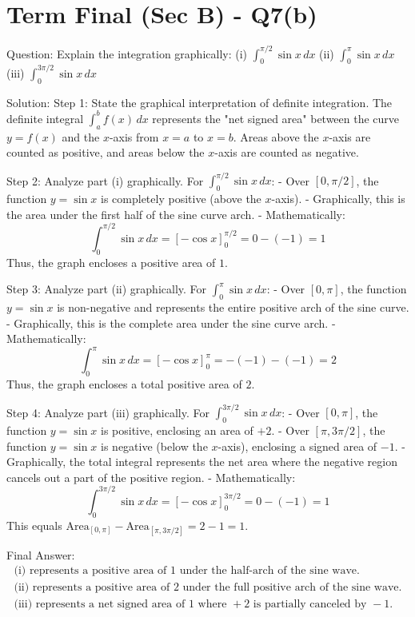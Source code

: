 \documentclass{article}
\begin{document}
\section*{Term Final (Sec B) - Q7(b)}
Question:
Explain the integration graphically:
(i) $\int_0^{\pi/2} \sin x \, dx$ 
(ii) $\int_0^{\pi} \sin x \, dx$ 
(iii) $\int_0^{3\pi/2} \sin x \, dx$

Solution:
Step 1: State the graphical interpretation of definite integration.
The definite integral $\int_a^b f(x) \, dx$ represents the "net signed area" between the curve $y = f(x)$ and the $x$-axis from $x=a$ to $x=b$. Areas above the $x$-axis are counted as positive, and areas below the $x$-axis are counted as negative.

Step 2: Analyze part (i) graphically.
For $\int_0^{\pi/2} \sin x \, dx$:
- Over $[0, \pi/2]$, the function $y = \sin x$ is completely positive (above the $x$-axis).
- Graphically, this is the area under the first half of the sine curve arch.
- Mathematically:
  \[
  \int_0^{\pi/2} \sin x \, dx = [-\cos x]_0^{\pi/2} = 0 - (-1) = 1
  \]
  Thus, the graph encloses a positive area of $1$.

Step 3: Analyze part (ii) graphically.
For $\int_0^{\pi} \sin x \, dx$:
- Over $[0, \pi]$, the function $y = \sin x$ is non-negative and represents the entire positive arch of the sine curve.
- Graphically, this is the complete area under the sine curve arch.
- Mathematically:
  \[
  \int_0^{\pi} \sin x \, dx = [-\cos x]_0^{\pi} = -(-1) - (-1) = 2
  \]
  Thus, the graph encloses a total positive area of $2$.

Step 4: Analyze part (iii) graphically.
For $\int_0^{3\pi/2} \sin x \, dx$:
- Over $[0, \pi]$, the function $y = \sin x$ is positive, enclosing an area of $+2$.
- Over $[\pi, 3\pi/2]$, the function $y = \sin x$ is negative (below the $x$-axis), enclosing a signed area of $-1$.
- Graphically, the total integral represents the net area where the negative region cancels out a part of the positive region.
- Mathematically:
  \[
  \int_0^{3\pi/2} \sin x \, dx = [-\cos x]_0^{3\pi/2} = 0 - (-1) = 1
  \]
  This equals $\text{Area}_{[0, \pi]} - \text{Area}_{[\pi, 3\pi/2]} = 2 - 1 = 1$.

Final Answer:
\[
\boxed{
\begin{aligned}
\text{(i) represents a positive area of } 1 \text{ under the half-arch of the sine wave.} \\
\text{(ii) represents a positive area of } 2 \text{ under the full positive arch of the sine wave.} \\
\text{(iii) represents a net signed area of } 1 \text{ where } +2 \text{ is partially canceled by } -1.
\end{aligned}
}
\]
\end{document}

